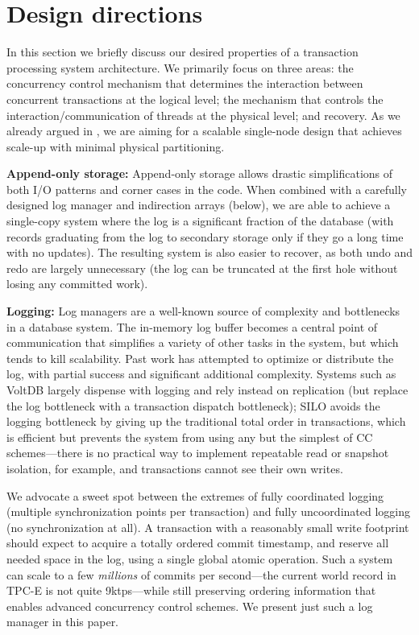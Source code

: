 \section{Design directions}

In this section we briefly discuss our desired properties of a transaction processing system architecture. We primarily focus on three areas: the concurrency control mechanism that determines the interaction between concurrent transactions at the logical level; the mechanism that controls the interaction/communication of threads at the physical level; and recovery. As we already argued in , we are aiming for a scalable single-node design that achieves scale-up with minimal physical partitioning.  

\vspace{2mm} 
{\bf Append-only storage:}
Append-only storage allows drastic simplifications of both I/O patterns and corner cases in the code. When combined with a carefully designed log manager and indirection arrays (below), we are able to achieve a single-copy system where the log is a significant fraction of the database (with records graduating from the log to secondary storage only if they go a long time with no updates). The resulting system is also easier to recover, as both undo and redo are largely unnecessary (the log can be truncated at the first hole without losing any committed work).

\vspace{2mm} 
{\bf Logging:}
Log managers are a well-known source of complexity and bottlenecks in a database system. The in-memory log buffer becomes a central point of communication that simplifies a variety of other tasks in the system, but which tends to kill scalability. Past work has attempted to optimize\cite{Aether} or distribute\cite{PCM-logging} the log, with partial success and significant additional complexity. Systems such as VoltDB\cite{who?} largely dispense with logging and rely instead on replication (but replace the log bottleneck with a transaction dispatch bottleneck); SILO avoids the logging bottleneck by giving up the traditional total order in transactions, which is efficient but prevents the system from using any but the simplest of CC schemes---there is no practical way to implement repeatable read or snapshot isolation, for example, and transactions cannot see their own writes.

We advocate a sweet spot between the extremes of fully coordinated logging (multiple synchronization points per transaction) and fully uncoordinated logging (no synchronization at all). A transaction with a reasonably small write footprint should expect to acquire a totally ordered commit timestamp, and reserve all needed space in the log, using a single global atomic operation. Such a system can scale to a few {\em millions} of commits per second\cite{silo}---the current world record in TPC-E is not quite 9ktps---while still preserving ordering information that enables advanced concurrency control schemes. We present just such a log manager in this paper.

